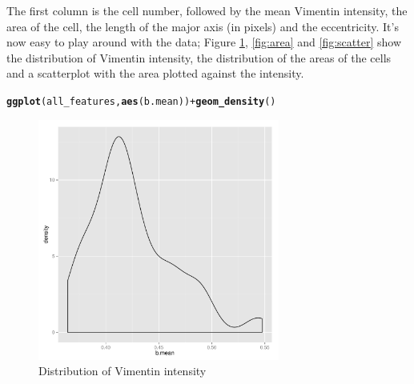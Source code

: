 \documentclass{article}\usepackage[]{graphicx}\usepackage[]{color}
\makeatletter
\newcommand{\hlopt}[1]{\textcolor[rgb]{0,0,0}{#1}}%
\newcommand{\hlstd}[1]{\textcolor[rgb]{0.345,0.345,0.345}{#1}}%
\newcommand{\hlkwd}[1]{\textcolor[rgb]{0.737,0.353,0.396}{\textbf{#1}}}%
\newenvironment{kframe}{%
 \def\at@end@of@kframe{}%
 \ifinner\ifhmode%
  \def\at@end@of@kframe{\end{minipage}}%
  \begin{minipage}{\columnwidth}%
 \fi\fi%
 \def\FrameCommand##1{\hskip\@totalleftmargin \hskip-\fboxsep
 \colorbox{shadecolor}{##1}\hskip-\fboxsep
     \hskip-\linewidth \hskip-\@totalleftmargin \hskip\columnwidth}%
 \MakeFramed {\advance\hsize-\width
   \@totalleftmargin\z@ \linewidth\hsize
   \@setminipage}}%
 {\par\unskip\endMakeFramed%
 \at@end@of@kframe}
\newenvironment{knitrout}{}{} %
\makeatother
\begin{document}
The first column is the cell number, followed by the mean Vimentin intensity, the area of the cell, the length of the major axis (in pixels) and the eccentricity.
It's now easy to play around with the data; Figure \ref{fig:intens}, \ref{fig:area} and \ref{fig:scatter} show the distribution of Vimentin intensity, the distribution of the areas of the cells and a scatterplot with the area plotted against the intensity.
\begin{knitrout}
\color{fgcolor}\begin{kframe}
\begin{alltt}
\hlkwd{ggplot}\hlstd{(all_features,} \hlkwd{aes}\hlstd{(b.mean))} \hlopt{+} \hlkwd{geom_density}\hlstd{()}
\end{alltt}
\end{kframe}\begin{figure}[]


{\centering \includegraphics[width=300px]{knit_figure/figintens} 

}

\caption[Distribution of Vimentin intensity]{Distribution of Vimentin intensity\label{fig:intens}}
\end{figure}


\end{knitrout}
\end{document}
